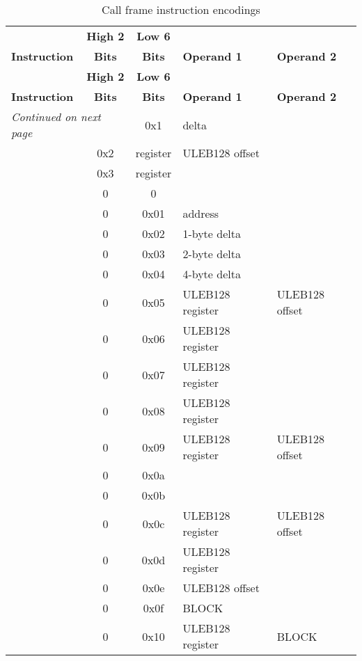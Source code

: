 \begin{centering}
\setlength{\extrarowheight}{0.1cm}
\begin{longtable}{l|c|c|l|l}
  \caption{Call frame instruction encodings} \label{tab:callframeinstructionencodings} \\
  \hline &\bfseries High 2 &\bfseries Low 6 &  & \\
  \bfseries Instruction&\bfseries Bits &\bfseries Bits &\bfseries Operand 1 &\bfseries Operand 2\\ \hline
\endfirsthead
   & \bfseries High 2 &\bfseries Low 6 &  &\\
  \bfseries Instruction&\bfseries Bits &\bfseries Bits &\bfseries Operand 1 &\bfseries Operand 2\\ \hline
\endhead
  \hline 
  \multicolumn{2}{l}{\emph{Continued on next page}}
\endfoot
  \hline
\endlastfoot

\DWCFAadvanceloc		&0x1&delta & \\
\DWCFAoffset			&0x2&register&ULEB128 offset \\
\DWCFArestore			&0x3&register & & \\
\DWCFAnop				&0&0 & & \\
\DWCFAsetloc			&0&0x01&address & \\
\DWCFAadvancelocone		&0&0x02&1-byte delta & \\
\DWCFAadvanceloctwo		&0&0x03&2-byte delta & \\
\DWCFAadvancelocfour	&0&0x04&4-byte delta & \\
\DWCFAoffsetextended	&0&0x05&ULEB128 register&ULEB128 offset \\
\DWCFArestoreextended	&0&0x06&ULEB128 register & \\
\DWCFAundefined			&0&0x07&ULEB128 register & \\
\DWCFAsamevalue			&0&0x08 &ULEB128 register & \\
\DWCFAregister			&0&0x09&ULEB128 register &ULEB128 offset \\
\DWCFArememberstate		&0&0x0a & & \\
\DWCFArestorestate		&0&0x0b & & \\
\DWCFAdefcfa			&0&0x0c &ULEB128 register&ULEB128 offset \\
\DWCFAdefcfaregister	&0&0x0d&ULEB128 register & \\
\DWCFAdefcfaoffset		&0&0x0e &ULEB128 offset & \\
\DWCFAdefcfaexpression	&0&0x0f &BLOCK  \\
\DWCFAexpression		&0&0x10&ULEB128 register & BLOCK \\


\end{longtable}
\end{centering}
